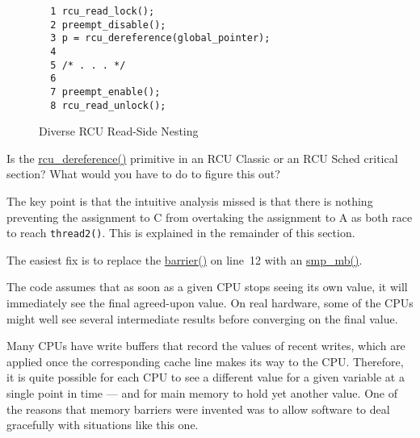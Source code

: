 \begin{figure}[htbp]
{ \centering
\begin{verbatim}
  1 rcu_read_lock();
  2 preempt_disable();
  3 p = rcu_dereference(global_pointer);
  4 
  5 /* . . . */
  6 
  7 preempt_enable();
  8 rcu_read_unlock();
\end{verbatim}
}
\caption{Diverse RCU Read-Side Nesting}
\label{fig:defer:Diverse RCU Read-Side Nesting}
\end{figure}

Is the \url{rcu_dereference()} primitive in an RCU Classic
or an RCU Sched critical section?
What would you have to do to figure this out?


	The key point is that the intuitive analysis missed is that
	there is nothing preventing the assignment to C from overtaking
	the assignment to A as both race to reach {\tt thread2()}.
	This is explained in the remainder of this section.


	The easiest fix is to replace the \url{barrier()} on
	line~12 with an \url{smp_mb()}.


	   The code assumes that as soon as a given CPU stops
	   seeing its own value, it will immediately see the
	   final agreed-upon value.
	   On real hardware, some of the CPUs might well see several
	   intermediate results before converging on the final value.


	   Many CPUs have write buffers that record the values of
	   recent writes, which are applied once the corresponding
	   cache line makes its way to the CPU.
	   Therefore, it is quite possible for each CPU to see a
	   different value for a given variable at a single point
	   in time --- and for main memory to hold yet another value.
	   One of the reasons that memory barriers were invented was
	   to allow software to deal gracefully with situations like
	   this one.

